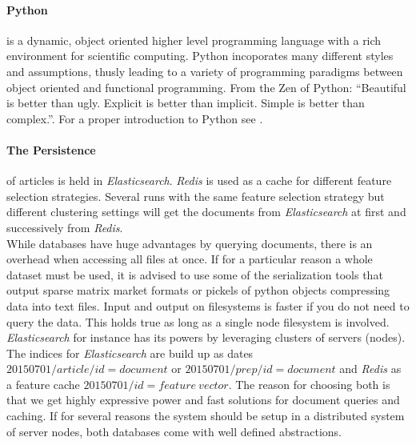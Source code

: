   \paragraph{Python} is a dynamic, object oriented higher level programming language with a rich environment for scientific computing. Python incoporates many different styles and assumptions, thusly leading to a variety of programming paradigms between object oriented and functional programming. From the Zen of Python: ``Beautiful is better than ugly. Explicit is better than implicit. Simple is better than complex.''. For a proper introduction to Python see \cite{NltkPython}.

  \paragraph{The Persistence} of articles is held in \emph{Elasticsearch}. \emph{Redis} is used as a cache for different feature selection strategies. Several runs with the same feature selection strategy but different clustering settings will get the documents from \emph{Elasticsearch} at first and successively from \emph{Redis}.\\
  While databases have huge advantages by querying documents, there is an overhead when accessing all files at once. If for a particular reason a whole dataset must be used, it is advised to use some of the serialization tools that output sparse matrix market formats or pickels of python objects compressing data into text files. Input and output on filesystems is faster if you do not need to query the data. This holds true as long as a single node filesystem is involved. \emph{Elasticsearch} for instance has its powers by leveraging clusters of servers (nodes).\\ 
  The indices for \emph{Elasticsearch} are build up as dates $20150701/article/id = document$ or $20150701/prep/id = document$ and \emph{Redis} as a feature cache $20150701/id = feature\:vector$. The reason for choosing both is that we get highly expressive power and fast solutions for document queries and caching. If for several reasons the system should be setup in a distributed system of server nodes, both databases come with well defined abstractions.

